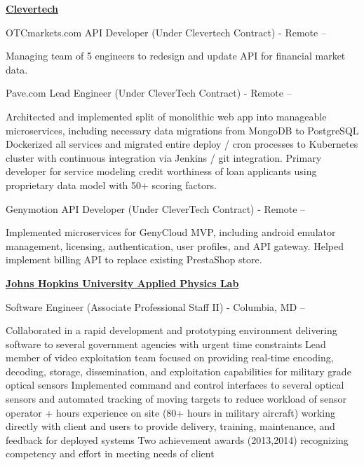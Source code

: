 \documentclass[a4paper,10pt,oneside]{article}
\begin{document}
\begin{minipage}[t][0pt]{\linewidth}
\begin{body}
\href{http://www.clevertech.biz/}
{\textbf{Clevertech}}
\par
OTCmarkets.com API Developer (Under Clevertech Contract) - Remote
\hfill
{} -- 
\begin{detail}
\BulletItem Managing team of 5 engineers to redesign and update API for financial market data. 
\end{detail}

\par
Pave.com Lead Engineer (Under CleverTech Contract) - Remote
\hfill
{} -- 
\begin{detail}
\BulletItem Architected and implemented split of monolithic web app into manageable microservices, including necessary data migrations from MongoDB to PostgreSQL
\BulletItem Dockerized all services and migrated entire deploy / cron processes to Kubernetes cluster with continuous integration via Jenkins / git integration. 
\BulletItem Primary developer for service modeling credit worthiness of loan applicants using proprietary data model with 50+ scoring factors. 
\end{detail} 

\par
Genymotion API Developer (Under CleverTech Contract) - Remote
\hfill
{} -- 
\begin{detail}
\BulletItem Implemented microservices for GenyCloud MVP, including android emulator management, licensing, authentication, user profiles, and API gateway. 
\BulletItem Helped implement billing API to replace existing PrestaShop store. 
\end{detail}

\EntryGap

\href{http://www.jhuapl.edu/}
{\textbf{Johns Hopkins University Applied Physics Lab}}
\par
Software Engineer (Associate Professional Staff II) - Columbia, MD
\hfill
{} --
\begin{detail}

\BulletItem
Collaborated in a rapid development and prototyping environment delivering software to several government agencies with urgent time constraints
\BulletItem
Lead member of video exploitation team focused on providing real-time encoding, decoding, storage, dissemination, and exploitation capabilities for military grade optical sensors
\BulletItem
Implemented command and control interfaces to several optical sensors and automated tracking of moving targets to reduce workload of sensor operator
+ hours experience on site (80+ hours in military aircraft) working directly with client and users to provide delivery, training, maintenance, and feedback for deployed systems
\BulletItem
Two achievement awards (2013,2014) recognizing competency and effort in meeting needs of client
\end{detail}


\end{body}
\end{minipage}
\end{document}
